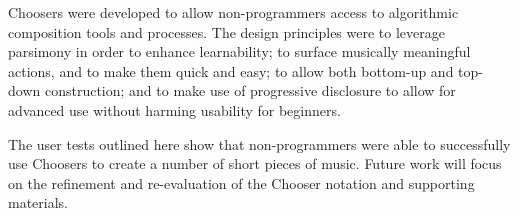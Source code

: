 \documentclass[]{article}
\begin{document}
Choosers were developed to allow non-programmers access to algorithmic
composition tools and processes. The design principles were to leverage
parsimony in order to enhance learnability; to surface musically
meaningful actions, and to make them quick and easy; to allow both
bottom-up and top-down construction; and to make use of progressive
disclosure to allow for advanced use without harming usability for
beginners.

The user tests outlined here show that non-programmers were able to
successfully use Choosers to create a number of short pieces of music.
Future work will focus on the refinement and re-evaluation of the
Chooser notation and supporting materials.
\end{document}
